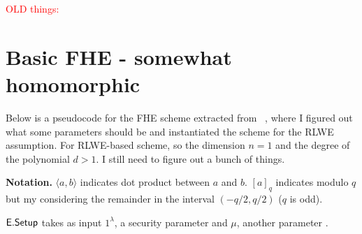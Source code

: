 \documentclass[11pt]{article}
\begin{document}
\newpage

\textcolor{red}{OLD things:}

\section{Basic FHE - somewhat homomorphic}



Below is a pseudocode for the FHE scheme extracted from ~\cite{BGV12}, where I figured out what some parameters should be and instantiated the scheme for the RLWE assumption.
For RLWE-based scheme, so the dimension $n=1$ and the degree of the polynomial $d>1$. I still need to figure out a bunch of things.


\textbf{Notation.} $\langle a, b \rangle$ indicates dot product between $a$ and $b$.  $[a]_q$ indicates modulo $q$ but my considering the remainder in the interval $(-q/2, q/2)$ ($q$ is odd).


$\mathsf{E.Setup}$ takes as input $1^\lambda$, a security parameter and $\mu$, another parameter .




\end{document}
